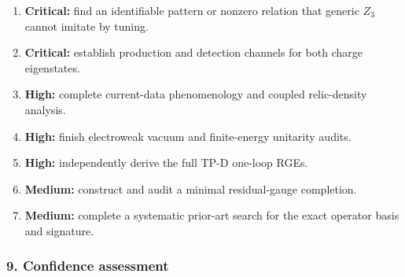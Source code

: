 \documentclass[
]{article}
\providecommand{\tightlist}{%
  \setlength{\itemsep}{0pt}\setlength{\parskip}{0pt}}
\begin{document}
\begin{enumerate}
\def\labelenumi{\arabic{enumi}.}
\tightlist
\item
  \textbf{Critical:} find an identifiable pattern or nonzero relation
  that generic \(Z_3\) cannot imitate by tuning.
\item
  \textbf{Critical:} establish production and detection channels for
  both charge eigenstates.
\item
  \textbf{High:} complete current-data phenomenology and coupled
  relic-density analysis.
\item
  \textbf{High:} finish electroweak vacuum and finite-energy unitarity
  audits.
\item
  \textbf{High:} independently derive the full TP-D one-loop RGEs.
\item
  \textbf{Medium:} construct and audit a minimal residual-gauge
  completion.
\item
  \textbf{Medium:} complete a systematic prior-art search for the exact
  operator basis and signature.
\end{enumerate}

\hypertarget{confidence-assessment}{%
\subsubsection{9. Confidence assessment}\label{confidence-assessment}}
\end{document}
